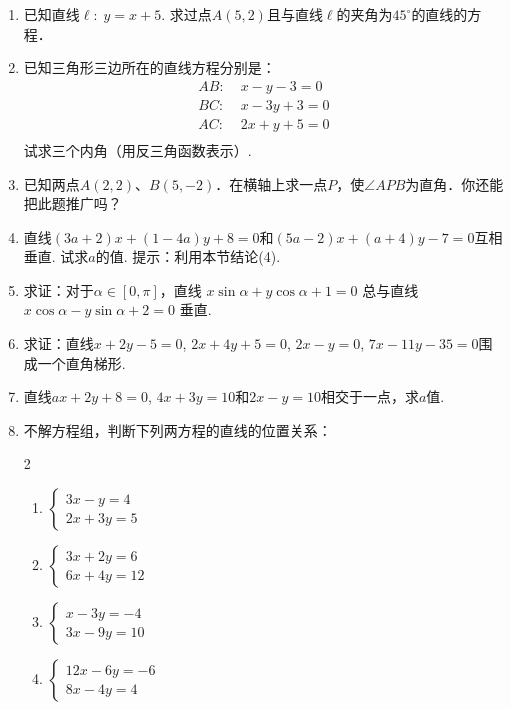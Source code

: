 \begin{enumerate}
    \item  已知直线$\ell:\; y=x+5$. 求过点$A(5,2)$且与直线$\ell$的夹角为$45^{\circ}$的直线的方程．
    \item 已知三角形三边所在的直线方程分别是：
\[\begin{split}
    AB:&\; x-y-3=0\\
    BC:&\; x-3y+3=0\\
    AC:&\; 2x+y+5=0\\
\end{split}\]
    试求三个内角（用反三角函数表示）.
    \item 已知两点$A(2,2)$、$B(5,-2)$．在横轴上求一点$P$，使$\angle APB$为直角．你还能把此题推广吗？
    \item 直线$(3a+2)x+(1-4a)y+8=0$和$(5a-2)x+(a+4)y-7=0$互相垂直. 试求$a$的值. 提示：利用本节结论(4).
    \item 求证：对于$\alpha\in [0,\pi]$，直线
    $x\sin\alpha+y\cos\alpha+1=0$
    总与直线
    $x\cos\alpha-y\sin\alpha+2=0$
    垂直.
    \item 求证：直线$x+2y-5=0$, $2x+4y+5=0$, $2x-y=0$, $7x-11y-35=0$围成一个直角梯形.
    \item 直线$ax+2y+8=0$, $4x+3y=10$和$2x-y=10$相交于一点，求$a$值.
    \item 不解方程组，判断下列两方程的直线的位置关系：
\begin{multicols}{2}
\begin{enumerate}[(1)]
    \item $\begin{cases}
        3x-y=4\\ 2x+3y=5
    \end{cases} $
    \item $\begin{cases}
        3x+2y=6\\ 6x+4y=12
    \end{cases} $
    \item $\begin{cases}
        x-3y=-4\\3x-9y=10
    \end{cases} $
    \item $\begin{cases}
        12x-6y=-6 \\ 8x-4y=4
    \end{cases} $
\end{enumerate}
\end{multicols}
\end{enumerate}

